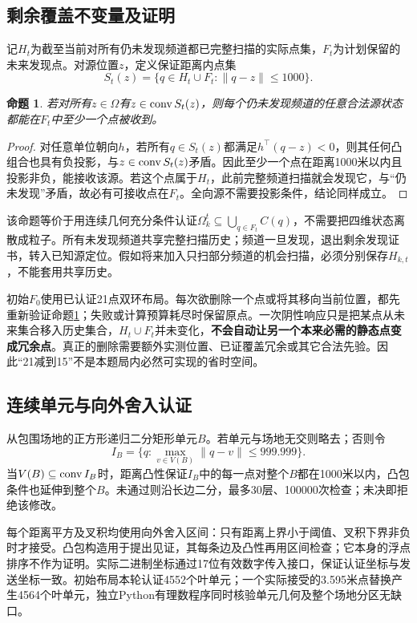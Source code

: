 \documentclass[UTF8,a4paper,zihao=-4,fontset=mac]{ctexart}
\newtheorem{proposition}{命题}\allowdisplaybreaks[2]\emergencystretch=2em
\begin{document}
\subsection{剩余覆盖不变量及证明}
记$H_t$为截至当前对所有仍未发现频道都已完整扫描的实际点集，$F_t$为计划保留的未来发现点。对源位置$z$，定义保证距离内点集
\begin{equation}S_t(z)=\{q\in H_t\cup F_t:\|q-z\|\le1000\}.
\end{equation}
\begin{proposition}\label{prop:residual}
若对所有$z\in\Omega$有$z\in\operatorname{conv} S_t(z)$，则每个仍未发现频道的任意合法源状态都能在$F_t$中至少一个点被收到。
\end{proposition}
\begin{proof}
对任意单位朝向$h$，若所有$q\in S_t(z)$都满足$h^\top(q-z)<0$，则其任何凸组合也具有负投影，与$z\in\operatorname{conv} S_t(z)$矛盾。因此至少一个点在距离1000米以内且投影非负，能接收该源。若这个点属于$H_t$，此前完整频道扫描就会发现它，与“仍未发现”矛盾，故必有可接收点在$F_t$。全向源不需要投影条件，结论同样成立。\end{proof}

该命题等价于用连续几何充分条件认证$\Omega_k^t\subseteq\bigcup_{q\in F_t}C(q)$，不需要把四维状态离散成粒子。所有未发现频道共享完整扫描历史；频道一旦发现，退出剩余发现证书，转入已知源定位。假如将来加入只扫部分频道的机会扫描，必须分别保存$H_{k,t}$，不能套用共享历史。

初始$F_0$使用已认证21点双环布局。每次欲删除一个点或将其移向当前位置，都先重新验证命题\ref{prop:residual}；失败或计算预算耗尽时保留原点。一次阴性响应只是把某点从未来集合移入历史集合，$H_t\cup F_t$并未变化，\textbf{不会自动让另一个本来必需的静态点变成冗余点}。真正的删除需要额外实测位置、已证覆盖冗余或其它合法先验。因此“21减到15”不是本题局内必然可实现的省时空间。

\subsection{连续单元与向外舍入认证}
从包围场地的正方形递归二分矩形单元$B$。若单元与场地无交则略去；否则令
\begin{equation}I_B=\{q:\max_{v\in V(B)}\|q-v\|\le999.999\}.
\end{equation}
当$V(B)\subseteq\operatorname{conv} I_B$时，距离凸性保证$I_B$中的每一点对整个$B$都在1000米以内，凸包条件也延伸到整个$B$。未通过则沿长边二分，最多30层、100000次检查；未决即拒绝该修改。

每个距离平方及叉积均使用向外舍入区间：只有距离上界小于阈值、叉积下界非负时才接受。凸包构造用于提出见证，其每条边及凸性再用区间检查；它本身的浮点排序不作为证明。实际二进制坐标通过17位有效数字传入接口，保证认证坐标与发送坐标一致。初始布局本轮认证4552个叶单元；一个实际接受的3.595米点替换产生4564个叶单元，独立Python有理数程序同时核验单元几何及整个场地分区无缺口。
\end{document}
